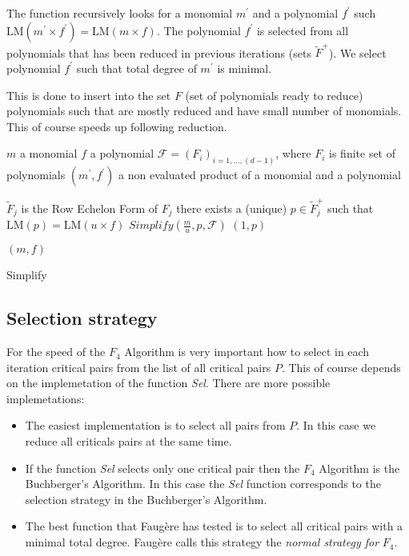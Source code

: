 The function recursively looks for a monomial $m^\prime$ and a polynomial $f^\prime$ such $\textrm{LM}(m^\prime\times f^\prime) = \textrm{LM}(m\times f)$. The polynomial $f^\prime$ is selected from all polynomials that has been reduced in previous iterations (sets $\tilde{F}^+$). We select polynomial $f^\prime$ such that total degree of $m^\prime$ is minimal.

This is done to insert into the set $F$ (set of polynomials ready to reduce) polynomials such that are mostly reduced and have small number of monomials. This of course speeds up following reduction.

\begin{algorithm}[ht]
  \begin{algorithmic}[1]
    \Require
      \Statex $m$ a monomial
      \Statex $f$ a polynomial
      \Statex $\mathcal{F} = (F_i)_{i=1,\ldots,(d-1)}$, where $F_i$ is finite set of polynomials
    \Ensure
      \Statex $(m^\prime, f^\prime)$ a non evaluated product of a monomial and a polynomial
      \Statex

        \State $\tilde{F}_j$ is the Row Echelon Form of $F_j$
        \State there exists a (unique) $p\in \tilde{F}^+_j$ such that $\textrm{LM}(p) = \textrm{LM}(u\times f)$
          \State \Return $Simplify(\frac{m}{u}, p, \mathcal{F})$
        \Else
          \State \Return $(1, p)$
        \EndIf
      \EndIf
    \EndFor

    \State \Return $(m, f)$

  \end{algorithmic}
  \caption{Simplify}
\end{algorithm}

\subsection{Selection strategy}
\label{subsec:F4:sel}
For the speed of the $F_4$ Algorithm is very important how to select in each iteration critical pairs from the list of all critical pairs $P$. This of course depends on the implemetation of the function \textit{Sel}. There are more possible implemetations:

\begin{itemize}
  \item The easiest implementation is to select all pairs from $P$. In this case we reduce all criticals pairs at the same time.
  \item If the function \textit{Sel} selects only one critical pair then the $F_4$ Algorithm is the Buchberger's Algorithm. In this case the \textit{Sel} function corresponds to the selection strategy in the Buchberger's Algorithm.
  \item The best function that Faug\`ere has tested is to select all critical pairs with a minimal total degree. Faug\`ere calls this strategy the \textit{normal strategy for} $F_4$.
\end{itemize}

